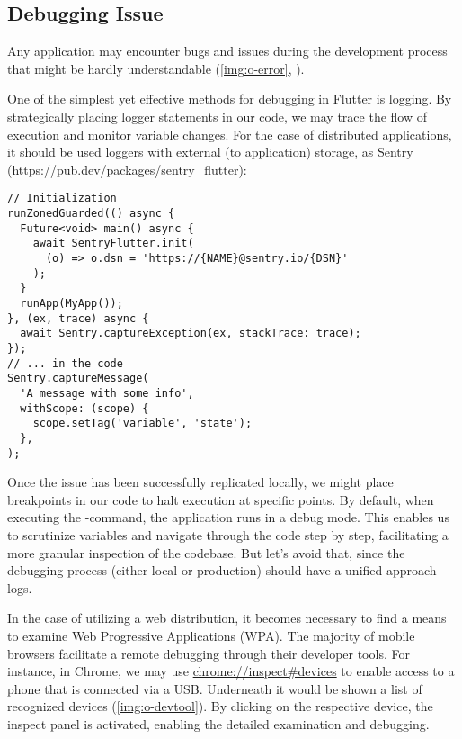 
\subsection{Debugging Issue}

Any application may encounter bugs and issues during the development process that might be hardly understandable 
(\cref{img:o-error}, ).


\noindent One of the simplest yet effective methods for debugging in Flutter is logging. By strategically placing logger 
statements in our code, we may trace the flow of execution and monitor variable changes. For the case of distributed 
applications, it should be used loggers with external (to application) storage, as Sentry
(\href{https://pub.dev/packages/sentry\_flutter}{https://pub.dev/packages/sentry\_flutter}):

\begin{lstlisting}
// Initialization
runZonedGuarded(() async {
  Future<void> main() async {
    await SentryFlutter.init(
      (o) => o.dsn = 'https://{NAME}@sentry.io/{DSN}'
    );
  }
  runApp(MyApp());
}, (ex, trace) async {
  await Sentry.captureException(ex, stackTrace: trace);
});
// ... in the code
Sentry.captureMessage(
  'A message with some info',
  withScope: (scope) {
    scope.setTag('variable', 'state');
  },
);
\end{lstlisting}

\noindent Once the issue has been successfully replicated locally, we might place breakpoints in our code to halt 
execution at specific points. By default, when executing the -command, the application runs in a
debug mode. This enables us to scrutinize variables and navigate through the code step by step, facilitating a more 
granular inspection of the codebase. But let's avoid that, since the debugging process (either local or production) 
should have a unified approach -- logs.

In the case of utilizing a web distribution, it becomes necessary to find a means to examine Web Progressive Applications 
(WPA). The majority of mobile browsers facilitate a remote debugging through their developer tools. For instance, 
in Chrome, we may use \href{chrome://inspect\#devices}{chrome://inspect\#devices} to enable access to a phone that is 
connected via a USB. Underneath it would be shown a list of recognized devices (\cref{img:o-devtool}). By clicking on 
the respective device, the inspect panel is activated, enabling the detailed examination and debugging.

